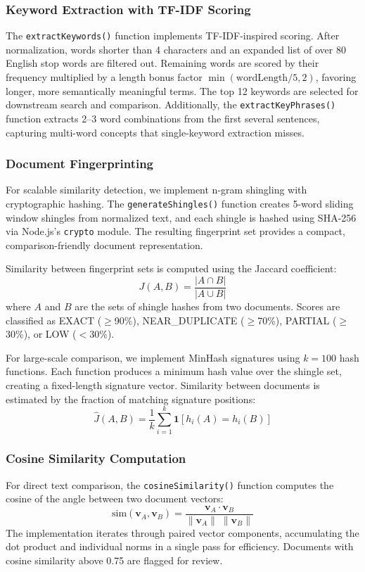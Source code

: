 \documentclass[10pt,twocolumn]{article}
\begin{document}
\subsubsection{Keyword Extraction with TF-IDF Scoring}
The \texttt{extractKeywords()} function implements TF-IDF-inspired scoring. After normalization, words shorter than 4 characters and an expanded list of over 80 English stop words are filtered out. Remaining words are scored by their frequency multiplied by a length bonus factor $\min(\text{wordLength}/5, 2)$, favoring longer, more semantically meaningful terms. The top 12 keywords are selected for downstream search and comparison. Additionally, the \texttt{extractKeyPhrases()} function extracts 2--3 word combinations from the first several sentences, capturing multi-word concepts that single-keyword extraction misses.

\subsubsection{Document Fingerprinting}
For scalable similarity detection, we implement n-gram shingling with cryptographic hashing. The \texttt{generateShingles()} function creates 5-word sliding window shingles from normalized text, and each shingle is hashed using SHA-256 via Node.js's \texttt{crypto} module. The resulting fingerprint set provides a compact, comparison-friendly document representation.

Similarity between fingerprint sets is computed using the Jaccard coefficient:
\begin{equation}
J(A, B) = \frac{|A \cap B|}{|A \cup B|}
\end{equation}
where $A$ and $B$ are the sets of shingle hashes from two documents. Scores are classified as EXACT ($\geq$90\%), NEAR\_DUPLICATE ($\geq$70\%), PARTIAL ($\geq$30\%), or LOW ($<$30\%).

For large-scale comparison, we implement MinHash signatures using $k=100$ hash functions. Each function produces a minimum hash value over the shingle set, creating a fixed-length signature vector. Similarity between documents is estimated by the fraction of matching signature positions:
\begin{equation}
\hat{J}(A, B) = \frac{1}{k} \sum_{i=1}^{k} \mathbf{1}[h_i(A) = h_i(B)]
\end{equation}

\subsubsection{Cosine Similarity Computation}
For direct text comparison, the \texttt{cosineSimilarity()} function computes the cosine of the angle between two document vectors:
\begin{equation}
\text{sim}(\mathbf{v}_A, \mathbf{v}_B) = \frac{\mathbf{v}_A \cdot \mathbf{v}_B}{\|\mathbf{v}_A\| \; \|\mathbf{v}_B\|}
\end{equation}
The implementation iterates through paired vector components, accumulating the dot product and individual norms in a single pass for efficiency. Documents with cosine similarity above 0.75 are flagged for review.
\end{document}
